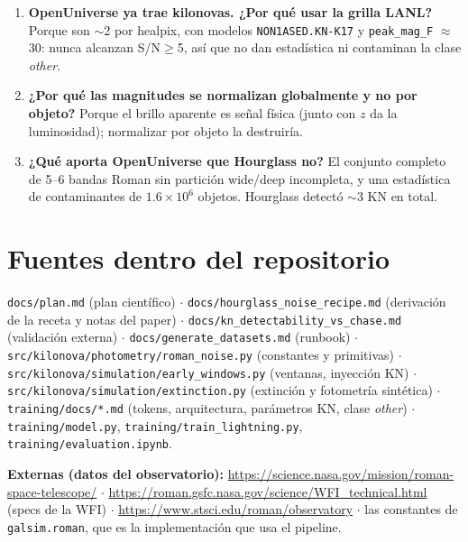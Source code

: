 \documentclass[11pt,a4paper]{article}
\newcommand{\code}[1]{\texttt{\small #1}}
\begin{document}
\begin{enumerate}[itemsep=3pt]
\item \textbf{OpenUniverse ya trae kilonovas. ¿Por qué usar la grilla LANL?}
      Porque son $\sim$2 por healpix, con modelos \code{NON1ASED.KN-K17} y \code{peak\_mag\_F}
      $\approx$ 30: nunca alcanzan S/N$\ge$5, así que no dan estadística ni contaminan la clase
      \emph{other}.

\item \textbf{¿Por qué las magnitudes se normalizan globalmente y no por objeto?}
      Porque el brillo aparente es señal física (junto con $z$ da la luminosidad); normalizar por
      objeto la destruiría.

\item \textbf{¿Qué aporta OpenUniverse que Hourglass no?}
      El conjunto completo de 5--6 bandas Roman sin partición wide/deep incompleta, y una
      estadística de contaminantes de $1.6\times10^6$ objetos. Hourglass detectó $\sim$3 KN en total.
\end{enumerate}

\section*{Fuentes dentro del repositorio}
\small
\code{docs/plan.md} (plan científico) $\cdot$ \code{docs/hourglass\_noise\_recipe.md} (derivación de
la receta y notas del paper) $\cdot$ \code{docs/kn\_detectability\_vs\_chase.md} (validación externa)
$\cdot$ \code{docs/generate\_datasets.md} (runbook) $\cdot$
\code{src/kilonova/photometry/roman\_noise.py} (constantes y primitivas) $\cdot$
\code{src/kilonova/simulation/early\_windows.py} (ventanas, inyección KN) $\cdot$
\code{src/kilonova/simulation/extinction.py} (extinción y fotometría sintética) $\cdot$
\code{training/docs/*.md} (tokens, arquitectura, parámetros KN, clase \emph{other}) $\cdot$
\code{training/model.py}, \code{training/train\_lightning.py}, \code{training/evaluation.ipynb}.

\medskip
\noindent\textbf{Externas (datos del observatorio):}
\url{https://science.nasa.gov/mission/roman-space-telescope/} $\cdot$
\url{https://roman.gsfc.nasa.gov/science/WFI_technical.html} (specs de la WFI) $\cdot$
\url{https://www.stsci.edu/roman/observatory} $\cdot$ las constantes de \code{galsim.roman},
que es la implementación que usa el pipeline.
\end{document}

